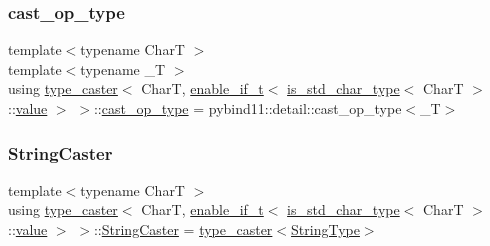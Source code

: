 \subsubsection{\texorpdfstring{cast\_op\_type}{cast\_op\_type}}
{\footnotesize\ttfamily template$<$typename CharT $>$ \\
template$<$typename \+\_\+T $>$ \\
using \mbox{\hyperlink{classtype__caster}{type\+\_\+caster}}$<$ CharT, \mbox{\hyperlink{detail_2common_8h_a012819c9e8b5e04872a271f50f8b8196}{enable\+\_\+if\+\_\+t}}$<$ \mbox{\hyperlink{cast_8h_a0ee0eaf3d12f9b0e472ed620777ba3c3}{is\+\_\+std\+\_\+char\+\_\+type}}$<$ CharT $>$\+::\mbox{\hyperlink{_s_d_l__opengl__glext_8h_a8ad81492d410ff2ac11f754f4042150f}{value}} $>$ $>$\+::\mbox{\hyperlink{structtype__caster_3_01_char_t_00_01enable__if__t_3_01is__std__char__type_3_01_char_t_01_4_1_1value_01_4_01_4_a319a8c4e37e2511027792bed0fc54637}{cast\+\_\+op\+\_\+type}} =  pybind11\+::detail\+::cast\+\_\+op\+\_\+type$<$\+\_\+T$>$}

\mbox{\label{structtype__caster_3_01_char_t_00_01enable__if__t_3_01is__std__char__type_3_01_char_t_01_4_1_1value_01_4_01_4_a10a64e7a7ab17aff6f024a8476cc22cc}} 
\subsubsection{\texorpdfstring{StringCaster}{StringCaster}}
{\footnotesize\ttfamily template$<$typename CharT $>$ \\
using \mbox{\hyperlink{classtype__caster}{type\+\_\+caster}}$<$ CharT, \mbox{\hyperlink{detail_2common_8h_a012819c9e8b5e04872a271f50f8b8196}{enable\+\_\+if\+\_\+t}}$<$ \mbox{\hyperlink{cast_8h_a0ee0eaf3d12f9b0e472ed620777ba3c3}{is\+\_\+std\+\_\+char\+\_\+type}}$<$ CharT $>$\+::\mbox{\hyperlink{_s_d_l__opengl__glext_8h_a8ad81492d410ff2ac11f754f4042150f}{value}} $>$ $>$\+::\mbox{\hyperlink{structtype__caster_3_01_char_t_00_01enable__if__t_3_01is__std__char__type_3_01_char_t_01_4_1_1value_01_4_01_4_a10a64e7a7ab17aff6f024a8476cc22cc}{String\+Caster}} =  \mbox{\hyperlink{classtype__caster}{type\+\_\+caster}}$<$\mbox{\hyperlink{structtype__caster_3_01_char_t_00_01enable__if__t_3_01is__std__char__type_3_01_char_t_01_4_1_1value_01_4_01_4_a70c19191e1d0747023b2391007be194c}{String\+Type}}$>$}

